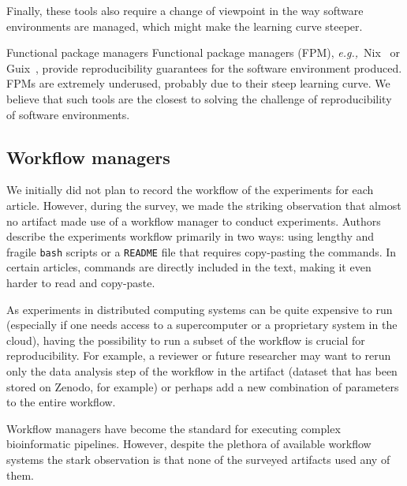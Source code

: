 \documentclass[sigconf,natbib=false]{acmart}
\newcommand{\eg}{\emph{e.g.,}}
\newcommand{\fmc}[1]{{\color{magenta} #1}} %
\begin{document}
Finally, these tools also require a change of viewpoint in the way software environments are managed, which might make the learning curve steeper. %


\begin{lesson}{Functional package managers}{}
  Functional package managers (FPM), \eg\ Nix\ \cite{dolstra_nix_2004} or Guix\ \cite{courtes_functional_2013}, provide reproducibility guarantees for the software environment produced.
  FPMs are extremely underused, probably due to their steep learning curve.
  We believe that such tools are the closest to solving the challenge of reproducibility of software environments.
\end{lesson}

\subsection{Workflow managers}\label{sec:sop:workflow}

We initially did not plan to record the workflow of the experiments for each article. 
However, during the survey, we made the striking observation that almost no artifact made use of a workflow manager to conduct experiments. 
Authors describe the experiments workflow primarily in two ways: 
using lengthy and fragile \texttt{bash} scripts or a \texttt{README} file that requires copy-pasting the commands.
In certain articles, commands are directly included in the text, making it even harder to read and copy-paste.

As experiments in distributed computing systems can be quite expensive to run (especially if one needs access to a supercomputer or a proprietary system in the cloud), having the possibility to run a subset of the workflow is crucial for reproducibility.
For example, a reviewer or future researcher may want to rerun only the data analysis step of the workflow in the artifact (dataset that has been stored on Zenodo, for example) or perhaps add a new combination of parameters to the entire workflow. 

Workflow managers \cite{wratten2021reproducible} have become the standard for executing complex bioinformatic pipelines.
However, despite the plethora of available workflow systems \cite{rafael_ferreira_da_silva_2023_7750670, koster2012snakemake, di2017nextflow, deelman2015pegasus, amstutz2016common, strozzi2019scalable, vivian2017toil} the stark observation is that none of the surveyed artifacts used any of them.
\end{document}

